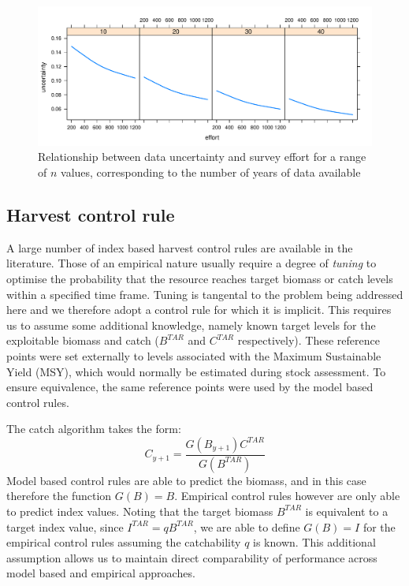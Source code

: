 \documentclass[11pt]{article} %
\begin{document}
\begin{figure}
\includegraphics[width=1\textwidth]{../res/uncertainty.pdf}
\caption{Relationship between data uncertainty and survey effort for a range of $n$ values, corresponding to the number of years of data available}
\label{fig:datauncertainty}
\end{figure}

\subsection{Harvest control rule}

A large number of index based harvest control rules are available in the literature. Those of an empirical nature usually require a degree of \textit{tuning} to optimise the probability that the resource reaches target biomass or catch levels within a specified time frame. Tuning is tangental to the problem being addressed here and we therefore adopt a control rule for which it is implicit. This requires us to assume some additional knowledge, namely known target levels for the exploitable biomass and catch ($B^{TAR}$ and $C^{TAR}$ respectively). These reference points were set externally to levels associated with the Maximum Sustainable Yield (MSY), which would normally be estimated during stock assessment. To ensure equivalence, the same reference points were used by the model based control rules.

The catch algorithm takes the form:
\begin{equation}
C_{y+1} = \frac{G(B_{y+1})C^{TAR}}{G(B^{TAR})}
\label{eq:hcr}
\end{equation}
Model based control rules are able to predict the biomass, and in this case therefore the function $G(B) = B$. Empirical control rules however are only able to predict index values. Noting that the target biomass $B^{TAR}$ is equivalent to a target index value, since $I^{TAR} = qB^{TAR}$, we are able to define $G(B) = I$ for the empirical control rules assuming the catchability $q$ is known. This additional assumption allows us to maintain direct comparability of performance across model based and empirical approaches.
\end{document}
